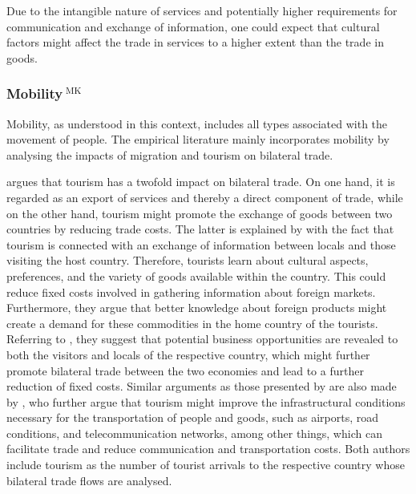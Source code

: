Due to the intangible nature of services and potentially higher requirements for communication and exchange of information, one could expect that cultural factors might affect the trade in services to a higher extent than the trade in goods. 

\subsubsection[Mobility]{Mobility$^{\text{ MK}}$}
\label{sec:mobility}

Mobility, as understood in this context, includes all types associated with the movement of people. The empirical literature mainly incorporates mobility by analysing the impacts of migration and tourism on bilateral trade. 

\textcite{Brau2013} argues that tourism has a twofold impact on bilateral trade. On one hand, it is regarded as an export of services and thereby a direct component of trade, while on the other hand, tourism might promote the exchange of goods between two countries by reducing trade costs. The latter is explained by \textcite{Brau2013} with the fact that tourism is connected with an exchange of information between locals and those visiting the host country. Therefore, tourists learn about cultural aspects, preferences, and the variety of goods available within the country. This could reduce fixed costs involved in gathering information about foreign markets. Furthermore, they argue that better knowledge about foreign products might create a demand for these commodities in the home country of the tourists. Referring to \textcite{Kulendran_2000}, they suggest that potential business opportunities are revealed to both the visitors and locals of the respective country, which might further promote bilateral trade between the two economies and lead to a further reduction of fixed costs. Similar arguments as those presented by \textcite{Brau2013} are also made by \textcite{SANTANAGALLEGO20161026}, who further argue that tourism might improve the infrastructural conditions necessary for the transportation of people and goods, such as airports, road conditions, and telecommunication networks, among other things, which can facilitate trade and reduce communication and transportation costs. Both authors include tourism as the number of tourist arrivals to the respective country whose bilateral trade flows are analysed. 

